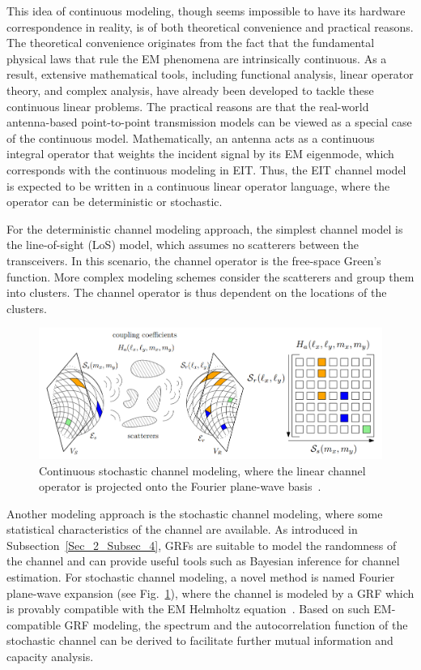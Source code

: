 \documentclass[journal,twocolumn]{IEEEtran}
\begin{document}
This idea of continuous modeling, though seems impossible to have its hardware correspondence in reality, is of both theoretical convenience and practical reasons. 
The theoretical convenience originates from the fact that the fundamental physical laws that rule the EM phenomena are intrinsically continuous. 
As a result, extensive mathematical tools, including functional analysis, linear operator theory, and complex analysis, have already been developed to tackle these continuous linear problems. 
The practical reasons are that the real-world antenna-based point-to-point transmission models can be viewed as a special case of the continuous model. 
Mathematically, an antenna acts as a continuous integral operator that weights the incident signal by its EM eigenmode, which corresponds with the continuous modeling in EIT. 
Thus, the EIT channel model is expected to be written in a continuous linear operator language, where the operator can be deterministic or stochastic.

For the deterministic channel modeling approach, the simplest channel model is the line-of-sight (LoS) model, which assumes no scatterers between the transceivers. In this scenario, the channel operator is the free-space Green's function. More complex modeling schemes consider the scatterers and group them into clusters. The channel operator is thus dependent on the locations of the clusters.

\begin{figure}
	\centering 
	\includegraphics[width=\linewidth]{figures/random_channel.png} 
	\caption{Continuous stochastic channel modeling, where the linear channel operator is projected onto the Fourier plane-wave basis~\cite{marzetta2022fourier}.} 
	\label{fig:marzetta}
\end{figure}
Another modeling approach is the stochastic channel modeling, where some statistical characteristics of the channel are available. As introduced in Subsection~\ref{Sec_2_Subsec_4}, GRFs are suitable to model the randomness of the channel and can provide useful tools such as Bayesian inference for channel estimation. 
For stochastic channel modeling, a novel method is named Fourier plane-wave expansion (see Fig.~\ref{fig:marzetta}), where the channel is modeled by a GRF which is provably compatible with the EM Helmholtz equation~\cite{marzetta2022fourier}. 
Based on such EM-compatible GRF modeling, the spectrum and the autocorrelation function of the stochastic channel can be derived to facilitate further mutual information and capacity analysis.
\end{document}
